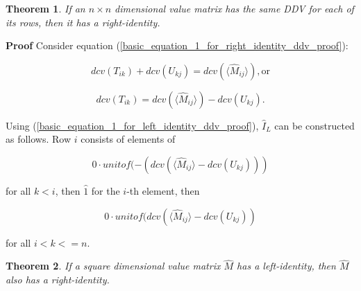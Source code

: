 \documentclass[10pt,letterpaper]{article}
\newtheorem{thm}{Theorem}[section]
\newenvironment{proof}{\noindent\textbf{Proof} }{\qed \newline}
\newcommand{\qed}{\nobreak \ifvmode \relax \else
      \ifdim\lastskip<1.5em \hskip-\lastskip
      \hskip1.5em plus0em minus0.5em \fi \nobreak
      \vrule height0.75em width0.5em depth0.25em\fi}
\numberwithin{equation}{section}
\begin{document}
\begin{thm} \label{if_same_row_ddvs_then_IR} If an $n \times n$ dimensional value matrix has the same DDV for each of its rows, then it has a right-identity.\end{thm}

\begin{proof} Consider equation (\ref{basic_equation_1_for_right_identity_ddv_proof}):

\[ dcv(T_{ik}) + dcv(U_{kj}) = dcv( \langle \hat M_{ij} \rangle ) , \mbox{or} \]

\begin{equation} dcv(T_{ik}) = dcv( \langle \hat M_{ij} \rangle ) - dcv(U_{kj}) . \end{equation}

Using (\ref{basic_equation_1_for_left_identity_ddv_proof}), $\hat I_L$ can be constructed as follows.  Row $i$ consists of elements of 

\[ 0 \cdot unitof( -(dcv( \langle \hat M_{ij} \rangle - dcv(U_{kj}))) \]

for all $k < i$, then $\hat 1$ for the $i$-th element, then

\[ 0 \cdot unitof( dcv( \langle \hat M_{ij} \rangle - dcv(U_{kj})) \]

for all $i < k <= n$. \end{proof}

\begin{thm}If a square dimensional value matrix $\hat M$  has a
  left-identity, then $\hat M$ also has a right-identity.\end{thm}
\end{document}
